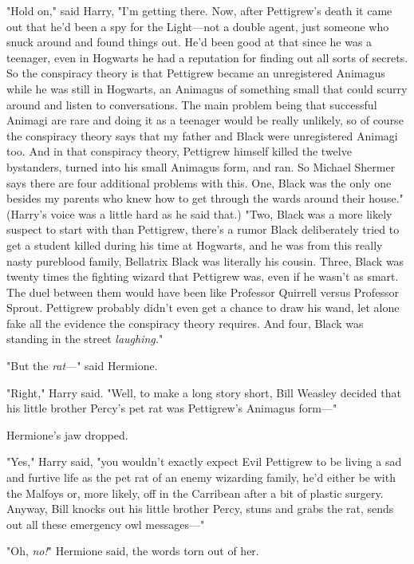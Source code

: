 "Hold on," said Harry, "I'm getting there. Now, after Pettigrew's death it came 
out that he'd been a spy for the Light---not a double agent, just someone who 
snuck around and found things out. He'd been good at that since he was a 
teenager, even in Hogwarts he had a reputation for finding out all sorts of 
secrets. So the conspiracy theory is that Pettigrew became an unregistered 
Animagus while he was still in Hogwarts, an Animagus of something small that 
could scurry around and listen to conversations. The main problem being that 
successful Animagi are rare and doing it as a teenager would be really 
unlikely, so of course the conspiracy theory says that my father and Black were 
unregistered Animagi too. And in that conspiracy theory, Pettigrew himself 
killed the twelve bystanders, turned into his small Animagus form, and ran. So 
Michael Shermer says there are four additional problems with this. One, Black 
was the only one besides my parents who knew how to get through the wards 
around their house." (Harry's voice was a little hard as he said that.) "Two, 
Black was a more likely suspect to start with than Pettigrew, there's a rumor 
Black deliberately tried to get a student killed during his time at Hogwarts, 
and he was from this really nasty pureblood family, Bellatrix Black was 
literally his cousin. Three, Black was twenty times the fighting wizard that 
Pettigrew was, even if he wasn't as smart. The duel between them would have 
been like Professor Quirrell versus Professor Sprout. Pettigrew probably didn't 
even get a chance to draw his wand, let alone fake all the evidence the 
conspiracy theory requires. And four, Black was standing in the street 
\emph{laughing.}"

"But the \emph{rat}---" said Hermione.

"Right," Harry said. "Well, to make a long story short, Bill Weasley decided 
that his little brother Percy's pet rat was Pettigrew's Animagus form---"

Hermione's jaw dropped.

"Yes," Harry said, "you wouldn't exactly expect Evil Pettigrew to be living a 
sad and furtive life as the pet rat of an enemy wizarding family, he'd either 
be with the Malfoys or, more likely, off in the Carribean after a bit of 
plastic surgery. Anyway, Bill knocks out his little brother Percy, stuns and 
grabs the rat, sends out all these emergency owl messages---"

"Oh, \emph{no!}" Hermione said, the words torn out of her.

